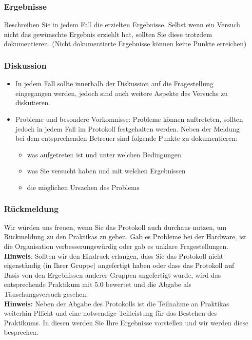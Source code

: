 \subsubsection{Ergebnisse}
Beschreiben Sie in jedem Fall die erzielten Ergebnisse. Selbst wenn ein Versuch nicht das gewünschte Ergebnis erziehlt hat, sollten Sie diese trotzdem dokumentieren. (Nicht dokumentierte Ergebnisse können keine Punkte erreichen)

\subsubsection{Diskussion}
\begin{itemize}
	\item In jedem Fall sollte innerhalb der Diskussion auf die Fragestellung eingegangen werden, jedoch sind auch weitere Aspekte des Versuchs zu diskutieren.
	\newpage
	\item Probleme und besondere Vorkomnisse: Probleme können auftreteten, sollten jedoch in jedem Fall im Protokoll festgehalten werden. Neben der Meldung bei dem entsprechenden Betreuer sind folgende Punkte zu dokumentieren:
	\begin{itemize}
		\item was aufgetreten ist und unter welchen Bedingungen
		\item was Sie versucht haben und mit welchen Ergebnissen
		\item die möglichen Ursachen des Problems
	\end{itemize}
\end{itemize}

\subsubsection{Rückmeldung}
Wir würden uns freuen, wenn Sie das Protokoll auch durchaus nutzen, um Rückmeldung zu den Praktikas zu geben. Gab es Probleme bei der Hardware, ist die Organisation verbesserungswürdig oder gab es unklare Fragestellungen. \\

\textbf{Hinweis}: Sollten wir den Eindruck erlangen, dass Sie das Protokoll nicht eigenständig (in Ihrer Gruppe) angefertigt haben oder dass das Protokoll auf Basis von den Ergebnissen anderer Gruppen angefertigt wurde, wird das entsprechende Praktikum mit 5.0 bewertet und die Abgabe als Täuschungsversuch gesehen.
\\

\textbf{Hinweis:} Neben der Abgabe des Protokolls ist die Teilnahme an Praktikas weiterhin Pflicht und eine notwendige Teilleistung für das Bestehen des Praktikums. In diesen werden Sie Ihre Ergebnisse vorstellen und wir werden diese besprechen.

